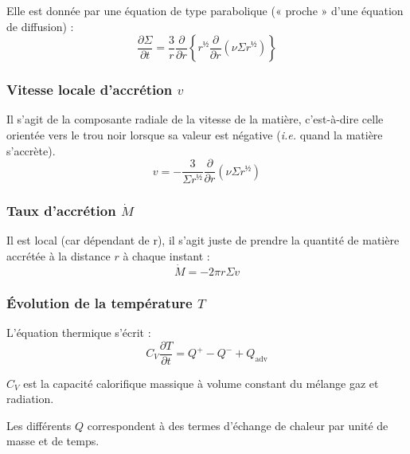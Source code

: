 Elle est donnée par une équation de type parabolique (« proche » d’une équation
de diffusion) :
\begin{equation}
    \label{eq:densite_surface}
    \frac{\partial \Sigma}{\partial t} = \frac{3}{r} \frac{\partial}{\partial r} \left\{ r^½ \frac{\partial}{\partial r} \left(\nu \Sigma r^½ \right) \right\}
\end{equation}

\subsubsection{\texorpdfstring{Vitesse locale d’accrétion $v$}{Vitesse locale d’accrétion v}}

Il s’agit de la composante radiale de la vitesse de la matière, c’est-à-dire
celle orientée vers le trou noir lorsque sa valeur est négative (\textit{i.e.}
quand la matière s’accrète).
\begin{equation}
    \label{eq:vitesse_accretion}
    v = - \frac{3}{\Sigma r^½} \frac{\partial}{\partial r} \left( \nu \Sigma r^½ \right)
\end{equation}

\subsubsection{\texorpdfstring{Taux d’accrétion $\dot{M}$}{Taux d’accrétion dM/dt}}

Il est local (car dépendant de r), il s’agit juste de prendre la quantité de
matière accrétée à la distance $r$ à chaque instant :
\begin{equation}
    \label{eq:taux_accretion}
    \dot{M} = - 2 \pi r \Sigma v
\end{equation}

\subsubsection{\texorpdfstring{Évolution de la température $T$}{Évolution de la température \textit{T}}}

L’équation thermique s’écrit :
\begin{equation}
    \label{eq:equation_thermique_th}
    C_V \frac{\partial T}{\partial t} = Q^+ - Q^- + Q_\mathrm{adv}
\end{equation}

$C_V$ est la capacité calorifique massique à volume constant du mélange gaz et
radiation.

Les différents $Q$ correspondent à des termes d’échange de chaleur par unité de
masse et de temps.

